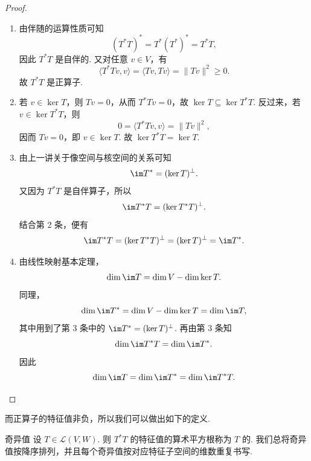 \begin{proof}
    \begin{enumerate}
        \item 由伴随的运算性质可知
              \[
                  (T^*T)^* = T^*(T^*)^* = T^*T,
              \]
              因此 $ T^*T $ 是自伴的. 又对任意 $ v \in V $，有
              \[
                  \langle T^*Tv, v \rangle = \langle Tv, Tv \rangle = \lVert Tv \rVert^2 \geqslant 0.
              \]
              故 $ T^*T $ 是正算子.

        \item 若 $ v \in \ker T $，则 $ Tv = 0 $，从而 $ T^*Tv = 0 $，故 $ \ker T \subseteq \ker T^*T $. 反过来，若 $ v \in \ker T^*T $，则
              \[
                  0 = \langle T^*Tv, v \rangle = \lVert Tv \rVert^2,
              \]
              因而 $ Tv = 0 $，即 $ v \in \ker T $. 故 $ \ker T^*T = \ker T $.

        \item 由上一讲关于像空间与核空间的关系可知
              \[
                  \im T^* = (\ker T)^{\perp}.
              \]
              又因为 $ T^*T $ 是自伴算子，所以
              \[
                  \im T^*T = (\ker T^*T)^{\perp}.
              \]
              结合第 2 条，便有
              \[
                  \im T^*T = (\ker T^*T)^{\perp} = (\ker T)^{\perp} = \im T^*.
              \]

        \item 由线性映射基本定理，
              \[
                  \dim \im T = \dim V - \dim \ker T.
              \]
              同理，
              \[
                  \dim \im T^* = \dim V - \dim \ker T = \dim \im T,
              \]
              其中用到了第 3 条中的 $ \im T^* = (\ker T)^\perp $. 再由第 3 条知
              \[
                  \dim \im T^*T = \dim \im T^*.
              \]
              因此
              \[
                  \dim \im T = \dim \im T^* = \dim \im T^*T.
              \]
    \end{enumerate}
\end{proof}

而正算子的特征值非负，所以我们可以做出如下的定义.

\begin{definition}{奇异值}{} 
    设 $ T \in \mathcal{L}(V, W) $. 则 $ T^*T $ 的特征值的算术平方根称为 $ T $ 的. 我们总将奇异值按降序排列，并且每个奇异值按对应特征子空间的维数重复书写.
\end{definition}

